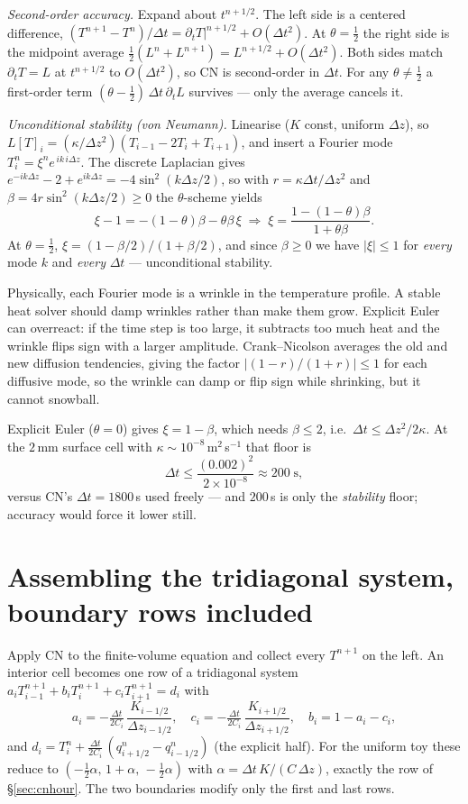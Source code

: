 \documentclass[11pt]{report}
\begin{document}
\emph{Second-order accuracy.} Expand about $t^{n+1/2}$. The left side is a centered
difference, $(T^{n+1}-T^n)/\Delta t=\partial_t T|^{n+1/2}+O(\Delta t^2)$. At
$\theta=\tfrac12$ the right side is the midpoint average
$\tfrac12(L^n+L^{n+1})=L^{n+1/2}+O(\Delta t^2)$. Both sides match
$\partial_t T=L$ at $t^{n+1/2}$ to $O(\Delta t^2)$, so CN is second-order in
$\Delta t$. For any $\theta\neq\tfrac12$ a first-order term
$(\theta-\tfrac12)\,\Delta t\,\partial_t L$ survives --- only the average cancels it.

\emph{Unconditional stability (von Neumann).} Linearise ($K$ const, uniform
$\Delta z$), so $L[T]_i=(\kappa/\Delta z^2)(T_{i-1}-2T_i+T_{i+1})$, and insert a
Fourier mode $T_i^n=\xi^n e^{\,ik\,i\Delta z}$. The discrete Laplacian gives
$e^{-ik\Delta z}-2+e^{ik\Delta z}=-4\sin^2(k\Delta z/2)$, so with $r=\kappa\Delta
t/\Delta z^2$ and $\beta=4r\sin^2(k\Delta z/2)\ge0$ the $\theta$-scheme yields
\[
\xi-1=-(1-\theta)\beta-\theta\beta\,\xi
\;\Rightarrow\;
\xi=\frac{1-(1-\theta)\beta}{1+\theta\beta}.
\]
At $\theta=\tfrac12$, $\xi=(1-\beta/2)/(1+\beta/2)$, and since $\beta\ge0$ we have
$|\xi|\le1$ for \emph{every} mode $k$ and \emph{every} $\Delta t$ --- unconditional
stability.

\begin{plain}
Physically, each Fourier mode is a wrinkle in the temperature profile. A stable
heat solver should damp wrinkles rather than make them grow. Explicit Euler can
overreact: if the time step is too large, it subtracts too much heat and the
wrinkle flips sign with a larger amplitude. Crank--Nicolson averages the old and
new diffusion tendencies, giving the factor $|(1-r)/(1+r)|\le1$ for each
diffusive mode, so the wrinkle can damp or flip sign while shrinking, but it
cannot snowball.
\end{plain}

Explicit Euler ($\theta=0$) gives $\xi=1-\beta$, which needs
$\beta\le2$, i.e.\ $\Delta t\le\Delta z^2/2\kappa$. At the $2$\,mm surface cell
with $\kappa\sim10^{-8}$\,m$^2$\,s$^{-1}$ that floor is
\[
\Delta t \le \frac{(0.002)^2}{2\times10^{-8}} \approx 200\;\text{s},
\]
versus CN's $\Delta t=1800$\,s used freely --- and $200$\,s is only the
\emph{stability} floor; accuracy would force it lower still.

\section{Assembling the tridiagonal system, boundary rows included}\label{app:assembly}
Apply CN to the finite-volume equation and collect every $T^{n+1}$ on the left.
An interior cell becomes one row of a tridiagonal system
$a_i T_{i-1}^{n+1}+b_i T_i^{n+1}+c_i T_{i+1}^{n+1}=d_i$ with
\[
a_i=-\tfrac{\Delta t}{2C_i}\,\frac{K_{i-1/2}}{\Delta z_{i-1/2}},\quad
c_i=-\tfrac{\Delta t}{2C_i}\,\frac{K_{i+1/2}}{\Delta z_{i+1/2}},\quad
b_i=1-a_i-c_i,
\]
and $d_i=T_i^n+\tfrac{\Delta t}{2C_i}\,(q_{i+1/2}^n-q_{i-1/2}^n)$ (the explicit
half). For the uniform toy these reduce to $(-\tfrac12\alpha,\,1+\alpha,\,
-\tfrac12\alpha)$ with $\alpha=\Delta t\,K/(C\,\Delta z)$, exactly the row of
\S\ref{sec:cnhour}. The two boundaries modify only the first and last rows.
\end{document}

